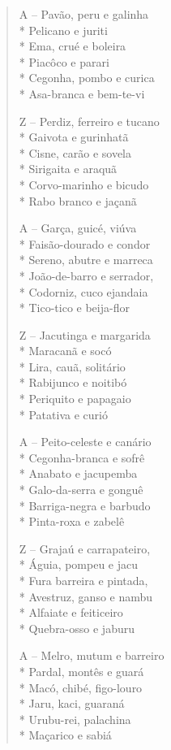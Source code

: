 \begin{verse}
A -- Pavão, peru e galinha\\*
Pelicano e juriti\\*
Ema, crué e boleira\\*
Piacôco e parari\\*
Cegonha, pombo e curica\\*
Asa-branca e bem-te-vi

Z -- Perdiz, ferreiro e tucano\\*
Gaivota e gurinhatã\\*
Cisne, carão e sovela\\*
Sirigaita e araquã\\*
Corvo-marinho e bicudo\\*
Rabo branco e jaçanã

A -- Garça, guicé, viúva\\*
Faisão-dourado e condor\\*
Sereno, abutre e marreca\\*
João-de-barro e serrador,\\*
Codorniz, cuco ejandaia\\*
Tico-tico e beija-flor

Z -- Jacutinga e margarida\\*
Maracanã e socó\\*
Lira, cauã, solitário\\*
Rabijunco e noitibó\\*
Periquito e papagaio\\*
Patativa e curió

A -- Peito-celeste e canário\\*
Cegonha-branca e sofrê\\*
Anabato e jacupemba\\*
Galo-da-serra e gonguê\\*
Barriga-negra e barbudo\\*
Pinta-roxa e zabelê

Z -- Grajaú e carrapateiro,\\*
Águia, pompeu e jacu\\*
Fura barreira e pintada,\\*
Avestruz, ganso e nambu\\*
Alfaiate e feiticeiro\\*
Quebra-osso e jaburu

A -- Melro, mutum e barreiro\\*
Pardal, montês e guará\\*
Macó, chibé, figo-louro\\*
Jaru, kaci, guaraná\\*
Urubu-rei, palachina\\*
Maçarico e sabiá


\end{verse}

